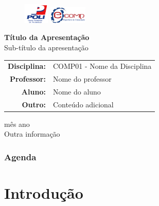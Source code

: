 \documentclass[brazil]{beamer}
\begin{document}
	\begin{frame}
		\begin{figure}[!htp]
			{\includegraphics[scale=0.2, width=1.2cm]{../imagens/poli.png}}\hfill%
			{\includegraphics[scale=0.3, width=1.8cm]{../imagens/ecomp.png}}%
		\end{figure}
		\begin{center}
			\vspace{0.5cm}
			\small{\textbf{Título da Apresentação}}\\[0.2cm]
			\small{Sub-título da apresentação}\\[0.5cm]
			\begin{center}
				\begin{tabular}{rl}
					\scriptsize{{\bf Disciplina:}} & \scriptsize{{\sf COMP01 - Nome da Disciplina}}\\
					\scriptsize{{\bf Professor:}} & \scriptsize{{\sf Nome do professor}}\\
					\scriptsize{{\bf Aluno:}} & \scriptsize{{\sf Nome do aluno}}\\
					\scriptsize{{\bf Outro:}} & \scriptsize{{\sf Conteúdo adicional}}\\
				\end{tabular}
				\vspace{0.2cm}
				\begin{center}
					\scriptsize{{\sc mês ano}}\\\scriptsize{{\sc Outra informação}}\\
				\end{center}
			\end{center}
		\end{center}
	\end{frame}

	\begin{frame}
		\frametitle{Agenda}
		\tableofcontents[hideallsubsections]
	\end{frame}


	\section{Introdução}
\end{document}
